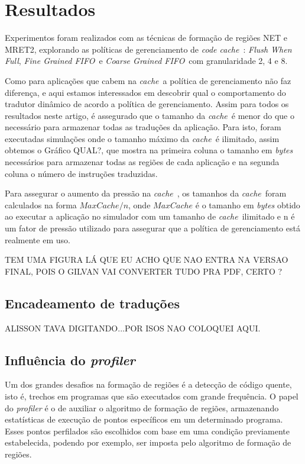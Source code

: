 \documentclass[12pt,twoside]{article}
\newcommand{\ccache}{\emph{code cache}}
\newcommand{\cache}{\emph{cache}}
\newcommand{\flush}{\emph{Flush When Full}}
\newcommand{\finefifo}{\emph{Fine Grained FIFO}}
\newcommand{\coarsefifo}{\emph{Coarse Grained FIFO}}
\begin{document}
\section{Resultados}
Experimentos foram realizados com as técnicas de formação de regiões NET e MRET2, explorando as políticas de gerenciamento de \ccache~: \flush, \finefifo~e \coarsefifo~com granularidade 2, 4 e 8. 

Como para aplicações que cabem na \cache~a política de gerenciamento não faz diferença, e aqui estamos interessados em descobrir qual o comportamento do tradutor dinâmico de acordo a política de gerenciamento. Assim para todos os resultados neste artigo, é assegurado que o tamanho da \cache~é menor do que o necessário para armazenar todas as traduções da aplicação. Para isto, foram executadas simulações onde o tamanho máximo da \cache~é ilimitado, assim obtemos o Gráfico {\large QUAL?}, que mostra na primeira coluna o tamanho em \emph{bytes} necessários para armazenar todas as regiões de cada aplicação e na segunda coluna o número de instruções traduzidas.

Para assegurar o aumento da pressão na \cache~, os tamanhos da \cache~foram calculados na forma $MaxCache/n$, onde $MaxCache$ é o tamanho em \emph{bytes} obtido ao executar a aplicação no simulador com um tamanho de \cache~ilimitado e n é um fator de pressão utilizado para assegurar que a política de gerenciamento está realmente em uso.

\begin{large}
TEM UMA FIGURA LÁ QUE EU ACHO QUE NAO ENTRA NA VERSAO FINAL, POIS O GILVAN VAI CONVERTER TUDO PRA PDF, CERTO ?
\end{large}


\subsection{Encadeamento de traduções}
\begin{large}
ALISSON TAVA DIGITANDO...POR ISOS NAO COLOQUEI AQUI.
\end{large}

\subsection{Influência do \emph{profiler}}
Um dos grandes desafios na formação de regiões é a detecção de código quente, isto é, trechos em programas que são executados com grande frequência. O papel do \emph{profiler} é o de auxiliar o algoritmo de formação de regiões, armazenando estatísticas de execução de pontos específicos em um determinado programa. Esses pontos perfilados são escolhidos com base em uma condição previamente estabelecida, podendo por exemplo, ser imposta pelo algoritmo de formação de regiões. 
\end{document}
